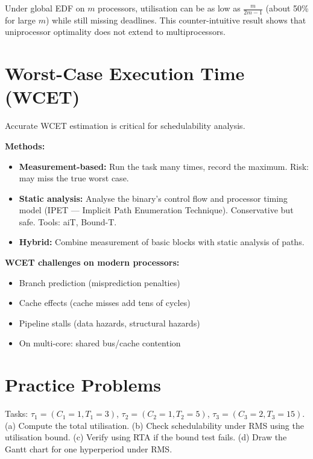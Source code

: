 \begin{important}
Under global EDF on $m$ processors, utilisation can be as low as $\frac{m}{2m-1}$ (about 50\% for large $m$) while still missing deadlines. This counter-intuitive result shows that uniprocessor optimality does not extend to multiprocessors.
\end{important}

\section{Worst-Case Execution Time (WCET)}
\label{sec:sched:wcet}

Accurate WCET estimation is critical for schedulability analysis.

\textbf{Methods:}
\begin{itemize}[nosep]
  \item \textbf{Measurement-based:} Run the task many times, record the maximum. Risk: may miss the true worst case.
  \item \textbf{Static analysis:} Analyse the binary's control flow and processor timing model (IPET --- Implicit Path Enumeration Technique). Conservative but safe. Tools: aiT, Bound-T.
  \item \textbf{Hybrid:} Combine measurement of basic blocks with static analysis of paths.
\end{itemize}

\textbf{WCET challenges on modern processors:}
\begin{itemize}[nosep]
  \item Branch prediction (misprediction penalties)
  \item Cache effects (cache misses add tens of cycles)
  \item Pipeline stalls (data hazards, structural hazards)
  \item On multi-core: shared bus/cache contention
\end{itemize}

\section{Practice Problems}
\label{sec:sched:practice}

\begin{exercise}
Tasks: $\tau_1 = (C_1=1, T_1=3)$, $\tau_2 = (C_2=1, T_2=5)$, $\tau_3 = (C_3=2, T_3=15)$. (a) Compute the total utilisation. (b) Check schedulability under RMS using the utilisation bound. (c) Verify using RTA if the bound test fails. (d) Draw the Gantt chart for one hyperperiod under RMS.
\end{exercise}

